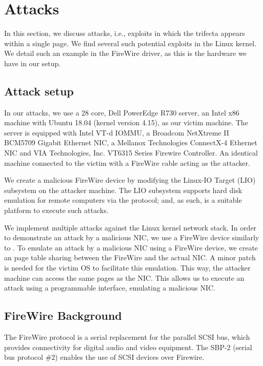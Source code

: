 \section{\simple{} Attacks}\label{sec:attack_setup}

In this section, we discuss \simple{} attacks, i.e., exploits in which the trifecta appears within a single page.
We find several such potential \simple{} exploits in the Linux kernel. We detail such an example in the FireWire driver, as this is the hardware we have in our setup. 



\subsection{Attack setup}
In our attacks, we use a 28 core, Dell PowerEdge R730 server, an Intel x86 machine with Ubuntu 18.04 (kernel version 4.15), as our victim machine. The server is equipped with Intel VT-d IOMMU, a Broadcom NetXtreme II BCM5709 Gigabit Ethernet NIC, a Mellanox Technologies ConnectX-4 Ethernet NIC and VIA Technologies, Inc. VT6315 Series Firewire Controller. An identical machine connected to the victim with a FireWire cable acting as the attacker. 

We create a malicious FireWire device by modifying the Linux-IO Target (LIO) subsystem on the attacker machine. The LIO subsystem supports hard disk emulation for remote computers via the \spb{} protocol; and, as such, is a suitable platform to execute such attacks. 

We implement multiple attacks against the Linux kernel network stack. In order to demonstrate an attack by a malicious NIC, we use a FireWire device similarly to \cite{SLND10}. To emulate an attack by a malicious NIC using a FireWire device, we create an \iova{} page table sharing between the FireWire and the actual NIC. A minor patch is needed for the victim OS to facilitate this emulation. This way, the attacker machine can access the same pages as the NIC. This allows us to execute an attack using a programmable interface, emulating a malicious NIC.

\subsection{FireWire Background}

The FireWire protocol is a serial replacement for the parallel SCSI bus, which provides connectivity for digital audio and video equipment. The SBP-2 (serial bus protocol $\#2$) enables the use of SCSI devices over Firewire. 

